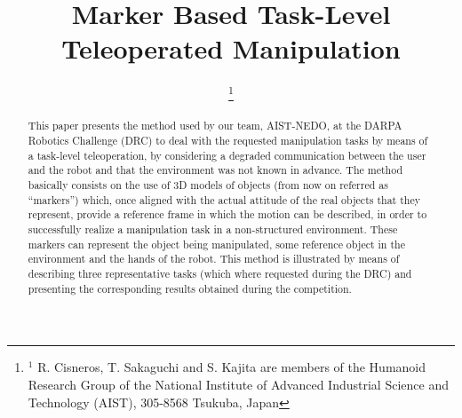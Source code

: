 \documentclass[letterpaper, 10 pt, conference]{ieeeconf}
\begin{document}
	\title{\LARGE \bf Marker Based Task-Level Teleoperated Manipulation}

	\author{
		\and
		\and
		\thanks{$^{1}$ R. Cisneros, T. Sakaguchi and S. Kajita are members of the
						Humanoid Research Group of the National Institute of Advanced Industrial Science
						and Technology (AIST), 305-8568 Tsukuba, Japan}}
  
	\maketitle

	\thispagestyle{empty}
	\pagestyle{empty}

	\begin{abstract}
		This paper presents the method used by our team, AIST-NEDO, at the DARPA Robotics Challenge (DRC) to deal with
		the requested manipulation tasks by means of a task-level teleoperation, by considering a degraded communication
		between the user and the robot and that the environment was not known in advance.
		The method basically consists on the use of 3D models of objects (from now on referred as ``markers'') which,
		once aligned with the actual attitude of the real objects that they represent, provide a reference frame in
		which the motion can be described, in order to successfully realize a manipulation task in a non-structured
		environment.
		These markers can represent the object being manipulated, some reference object in the environment and the
		hands of the robot.
		This method is illustrated by means of describing three representative tasks (which where requested during the DRC)
		and presenting the corresponding results obtained during the competition.
	\end{abstract}

	
	
		
		
	
		
	
		
	

	
		
	
	
	
	
	
	
	
\end{document}
